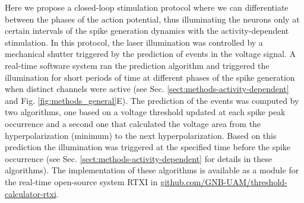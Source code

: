 
Here we propose a closed-loop stimulation protocol where we can differentiate between the phases of the action potential, thus illuminating the neurons only at certain intervals of the spike generation dynamics with the activity-dependent stimulation. In this protocol, the laser illumination was controlled by a mechanical shutter triggered by the prediction of events in the voltage signal. A real-time software system ran the prediction algorithm and triggered the illumination for short periods of time at different phases of the spike generation when distinct channels were active (see Sec. \ref{sect:methods-activity-dependent} and Fig. \ref{fig:methods_general}E). The prediction of the events was computed by two algorithms, one based on a voltage threshold updated at each spike peak occurrence and a second one that calculated the voltage area from the hyperpolarization (minimum) to the next hyperpolarization. Based on this prediction the illumination was triggered at the specified time before the spike occurrence (see Sec. \ref{sect:methods-activity-dependent} for details in these algorithms). The implementation of these algorithms is available as a module for the real-time open-source system RTXI \cite{Patel2017} in \href{https://github.com/GNB-UAM/threshold-calculator-rtxi}{github.com/GNB-UAM/threshold-calculator-rtxi}.

